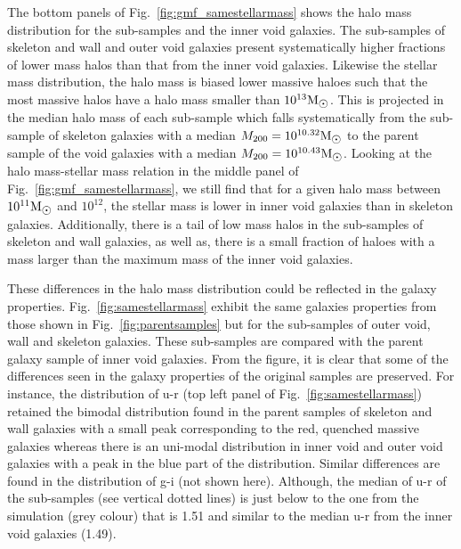 \documentclass[a4paper,fleqn,usenatbib,letter]{mnras}
\newcommand{\Msun}{\rm M_{\sun}}
\begin{document}
The bottom panels of Fig.~\ref{fig:gmf_samestellarmass} shows the halo mass distribution for the sub-samples  and the inner void galaxies. The sub-samples of skeleton and wall and outer void galaxies  present systematically higher fractions of lower mass halos than that from the inner void galaxies. Likewise the stellar mass distribution, the halo mass is biased lower massive haloes such that the most massive halos have a halo mass smaller than $10^{13}\Msun$. This is projected in the median halo mass of each sub-sample which falls systematically from the sub-sample of skeleton galaxies with a median $M_{200}=10^{10.32}\Msun$ to the parent sample of the void galaxies with  a median  $M_{200}=10^{10.43}\Msun$. Looking at the halo mass-stellar mass relation in the middle panel of Fig.~\ref{fig:gmf_samestellarmass}, we still find that for a given halo mass between $10^{11}\Msun$ and $10^{12}$, the stellar mass is lower in inner void galaxies than in skeleton galaxies. Additionally, there is a tail of low mass halos in the sub-samples of skeleton and wall galaxies, as well as, there is a small fraction of haloes with a mass larger than the maximum mass of the inner void galaxies. 


These differences in the halo mass distribution could be reflected in the galaxy properties.  
Fig.~\ref{fig:samestellarmass}  exhibit the same  galaxies properties from those shown in Fig.~\ref{fig:parentsamples} but for the sub-samples of  outer void, wall and skeleton galaxies. These sub-samples are compared with the parent galaxy sample of inner void galaxies. From the figure, it is clear that some of the differences seen in the galaxy properties of  the original samples are preserved.  For instance, the distribution of u-r (top left panel of Fig.~\ref{fig:samestellarmass}) retained the bimodal distribution  found in the parent samples of skeleton and wall galaxies with a small peak corresponding to the red, quenched massive galaxies  whereas there is an uni-modal distribution in inner void and outer void galaxies with a peak in the blue part of the distribution. Similar differences are found in the distribution of g-i (not shown here). Although, the median of u-r  of the sub-samples (see  vertical dotted lines) is just below to the one from the simulation (grey colour) that is 1.51 and similar to the median u-r from the inner void galaxies (1.49).    
\end{document}
